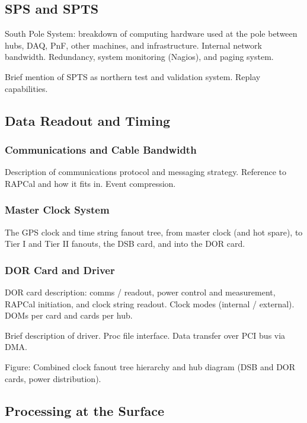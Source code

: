 \subsection{SPS and SPTS}

South Pole System: breakdown of computing hardware used at the pole between
hubs, DAQ, PnF, other machines, and infrastructure.  Internal network
bandwidth.  Redundancy, system monitoring (Nagios), and paging system.

Brief mention of SPTS as northern test and validation system.  Replay
capabilities.

\subsection{Data Readout and Timing}
\subsubsection{Communications and Cable Bandwidth}

Description of communications protocol and messaging strategy.  Reference
to RAPCal and how it fits in.  Event compression.


\subsubsection{Master Clock System}

The GPS clock and time string fanout tree, from master clock (and hot
spare), to Tier I and Tier II fanouts, the DSB card, and into the DOR card.

\subsubsection{DOR Card and Driver}

DOR card description: comms / readout, power control and measurement,
RAPCal initiation, and clock string readout.  Clock modes (internal /
external).  DOMs per card and cards per hub.

Brief description of driver.  Proc file interface.  Data transfer over PCI
bus via DMA.

Figure: Combined clock fanout tree hierarchy and hub diagram (DSB and DOR
cards, power distribution).

\subsection{Processing at the Surface}


